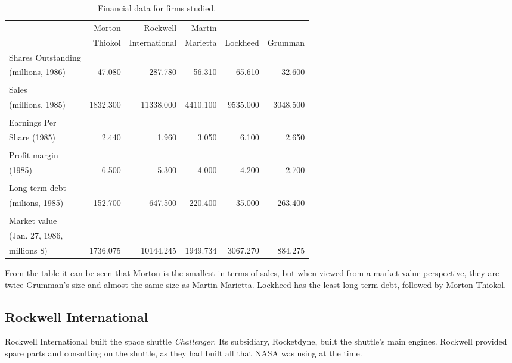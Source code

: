 \begin{table}[htbp]
\caption{Financial data for firms studied.}
\begin{tabular*}{6in}{l@{\extracolsep{.3ex}}rrrrr}
\hline\hline       
 & Morton & Rockwell & Martin &          &         \\
 & Thiokol & International & Marietta & Lockheed & Grumman \\
\hline
Shares Outstanding & & & & & \\
(millions, 1986) & 47.080 & 287.780 &  56.310 &  65.610 &  32.600 \\
 & & & & & \\
Sales & & & & & \\
(millions, 1985) & 1832.300 & 11338.000 & 4410.100 & 9535.000 & 3048.500 \\
 & & & & & \\
Earnings Per & & & & & \\
Share (1985) & 2.440 &   1.960 &   3.050 &   6.100 &   2.650 \\
 & & & & & \\
Profit margin & & & & & \\
(1985) & 6.500 & 5.300 &   4.000 &   4.200 &   2.700  \\
 & & & & & \\
Long-term debt & & & & & \\
(milions, 1985) & 152.700 & 647.500 & 220.400 &  35.000 & 263.400 \\
 & & & & & \\
Market value & & & & & \\
(Jan. 27, 1986, & & & & & \\
millions \$) & 1736.075 & 10144.245 & 1949.734 & 3067.270 & 884.275 \\ \hline
\end{tabular*}
\label{financial}
\end{table}

From the table it can be seen that Morton is the smallest in
terms of sales, but when viewed from a market-value
perspective, they are twice Grumman's size and almost the
same size as Martin Marietta.  Lockheed has the least long
term debt, followed by Morton Thiokol.

\subsection{Rockwell International}

Rockwell International built the space shuttle {\em
Challenger}.  Its subsidiary, Rocketdyne, built the
shuttle's main engines.  Rockwell provided spare parts and
consulting on the shuttle, as they had built all that NASA
was using at the time.

